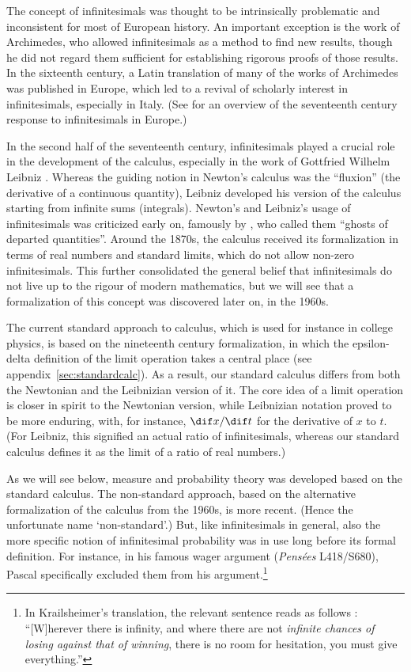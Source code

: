 The concept of infinitesimals was thought to be intrinsically problematic and inconsistent for most of European history. An important exception is the work of Archimedes, who allowed infinitesimals as a method to find new results, though he did not regard them sufficient for establishing rigorous proofs of those results. In the sixteenth century, a Latin translation of many of the works of Archimedes was published in Europe, which led to a revival of scholarly interest in infinitesimals, especially in Italy. (See \citealt{Alexander:2014} for an overview of the seventeenth century response to infinitesimals in Europe.)

In the second half of the seventeenth century, infinitesimals played a crucial role in the development of the calculus, especially in the work of Gottfried Wilhelm Leibniz \citep[see, \textit{e.g.},][]{KatzSherry:2012a,KatzSherry:2013}.
Whereas the guiding notion in Newton's calculus was the ``fluxion'' (the derivative of a continuous quantity), Leibniz developed his version of the calculus starting from infinite sums (integrals). Newton's and Leibniz's usage of infinitesimals was criticized early on, famously by \citet{Berkeley:1734}, who called them ``ghosts of departed quantities''.
Around the 1870s, the calculus received its formalization in terms of real numbers and standard limits, which do not allow non-zero infinitesimals. This further consolidated the general belief that infinitesimals do not live up to the rigour of modern mathematics, but we will see that a formalization of this concept was discovered later on, in the 1960s.

The current standard approach to calculus, which is used for instance in college physics, is based on the nineteenth century formalization, in which the epsilon-delta definition of the limit operation takes a central place (see appendix~\ref{sec:standardcalc}). As a result, our standard calculus differs from both the Newtonian and the Leibnizian version of it. The core idea of a limit operation is closer in spirit to the Newtonian version, while Leibnizian notation proved to be more enduring, with, for instance, $\dif x/\dif t$ for the derivative of $x$ to $t$. (For Leibniz, this signified an actual ratio of infinitesimals, whereas our standard calculus defines it as the limit of a ratio of real numbers.)

As we will see below, measure and probability theory was developed based on the standard calculus. The non-standard approach, based on the alternative formalization of the calculus from the 1960s, is more recent. (Hence the unfortunate name `non-standard'.) But, like infinitesimals in general, also the more specific notion of infinitesimal probability was in use long before its formal definition. For instance, in his famous wager argument (\textit{Pens{\'e}es} L418/S680), Pascal specifically excluded them from his argument.\footnote{In Krailsheimer's translation, the relevant sentence reads as follows \citep[p.~151, my emphasis]{Krailsheimer:1995}: ``[W]herever there is infinity, and where there are not \emph{infinite chances of losing against that of winning}, there is no room for hesitation, you must give everything.''}

